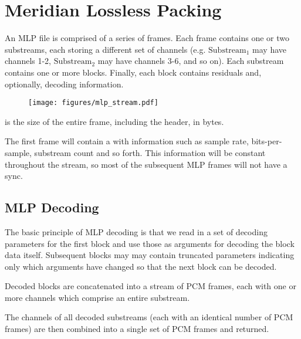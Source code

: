 
\chapter{Meridian Lossless Packing}

An MLP file is comprised of a series of frames.
Each frame contains one or two substreams, each storing a different
set of channels (e.g. $\text{Substream}_1$ may have channels 1-2,
$\text{Substream}_2$ may have channels 3-6, and so on).
Each substream contains one or more blocks.
Finally, each block contains  residuals
and, optionally, decoding information.
\begin{figure}[h]
\texttt{[image: figures/mlp\_stream.pdf]}
\end{figure}
\par
\noindent
{} is the size of the entire frame,
including the header, in bytes.
\par
The first frame will contain a  with information
such as sample rate, bits-per-sample, substream count and so forth.
This information will be constant throughout the stream,
so most of the subsequent MLP frames will not have a sync.

\section{MLP Decoding}

The basic principle of MLP decoding is that we read in a
set of decoding parameters for the first block and use those
as arguments for decoding the block data itself.
Subsequent blocks may may contain truncated parameters
indicating only which arguments have changed so that the
next block can be decoded.

Decoded blocks are concatenated into a stream of PCM frames,
each with one or more channels which comprise an entire substream.

The channels of all decoded substreams
(each with an identical number of PCM frames) are then combined
into a single set of PCM frames and returned.

\clearpage

